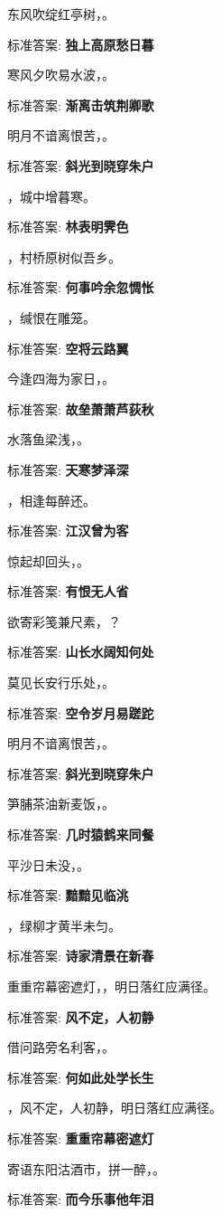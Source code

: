 \documentclass[12pt, a4paper, addpoints, answers]{exam}
\begin{document}
\begin{questions}
\question[3] 东风吹绽红亭树，\fillin 。

标准答案: \textbf{独上高原愁日暮}

\question[3] 寒风夕吹易水波，\fillin 。

标准答案: \textbf{渐离击筑荆卿歌}

\question[3] 明月不谙离恨苦，\fillin 。

标准答案: \textbf{斜光到晓穿朱户}

\question[3] \fillin ，城中增暮寒。

标准答案: \textbf{林表明霁色}

\question[3] \fillin ，村桥原树似吾乡。

标准答案: \textbf{何事吟余忽惆怅}

\question[3] \fillin ，缄恨在雕笼。

标准答案: \textbf{空将云路翼}

\question[3] 今逢四海为家日，\fillin 。

标准答案: \textbf{故垒萧萧芦荻秋}

\question[3] 水落鱼梁浅，\fillin[天寒梦泽深] 。

标准答案: \textbf{天寒梦泽深}

\question[3] \fillin ，相逢每醉还。

标准答案: \textbf{江汉曾为客}

\question[3] 惊起却回头，\fillin[有恨无人省] 。

标准答案: \textbf{有恨无人省}

\question[3] 欲寄彩笺兼尺素，\fillin ？

标准答案: \textbf{山长水阔知何处}

\question[3] 莫见长安行乐处，\fillin 。

标准答案: \textbf{空令岁月易蹉跎}

\question[3] 明月不谙离恨苦，\fillin 。

标准答案: \textbf{斜光到晓穿朱户}

\question[3] 笋脯茶油新麦饭，\fillin 。

标准答案: \textbf{几时猿鹤来同餐}

\question[3] 平沙日未没，\fillin 。

标准答案: \textbf{黯黯见临洮}

\question[3] \fillin ，绿柳才黄半未匀。

标准答案: \textbf{诗家清景在新春}

\question[3] 重重帘幕密遮灯，\fillin ，明日落红应满径。

标准答案: \textbf{风不定，人初静}

\question[3] 借问路旁名利客，\fillin 。

标准答案: \textbf{何如此处学长生}

\question[3] \fillin ，风不定，人初静，明日落红应满径。

标准答案: \textbf{重重帘幕密遮灯}

\question[3] 寄语东阳沽酒市，拼一醉，\fillin 。

标准答案: \textbf{而今乐事他年泪}
\end{questions}
\end{document}
